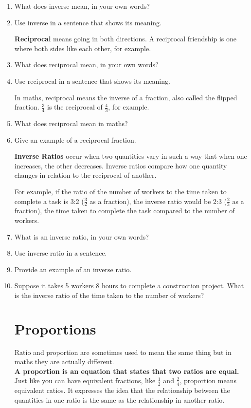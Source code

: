 \documentclass{article}
\begin{document}
\begin{spacing}{1.25}
\begin{enumerate}
\item What does inverse mean, in your own words?
\item Use inverse in a sentence that shows its meaning.

\textbf{Reciprocal} means going in both directions. A reciprocal friendship is one where both sides like each other, for example.

\item What does reciprocal mean, in your own words?
\item Use reciprocal in a sentence that shows its meaning.

In maths, reciprocal means the inverse of a fraction, also called the flipped fraction. $\frac{3}{4}$ is the reciprocal of $\frac{4}{3}$, for example.

\item What does reciprocal mean in maths?
\item Give an example of a reciprocal fraction.

\textbf{Inverse Ratios} occur when two quantities vary in such a way that when one increases, the other decreases. Inverse ratios compare how one quantity changes in relation to the reciprocal of another.

For example, if the ratio of the number of workers to the time taken to complete a task is 3:2 ($\frac{3}{2}$ as a fraction), the inverse ratio would be 2:3 ($\frac{2}{3}$ as a fraction), the time taken to complete the task compared to the number of workers.

\item What is an inverse ratio, in your own words?
\item Use inverse ratio in a sentence.
\item Provide an example of an inverse ratio.
\item Suppose it takes 5 workers 8 hours to complete a construction project. What is the inverse ratio of the time taken to the number of workers?

\section*{Proportions}
Ratio and proportion are sometimes used to mean the same thing but in maths they are actually different.\\

\textbf{A proportion is an equation that states that two ratios are equal.} Just like you can have equivalent fractions, like $\frac{1}{2}$ and $\frac{2}{4}$, proportion means equivalent ratios. It expresses the idea that the relationship between the quantities in one ratio is the same as the relationship in another ratio.


\end{enumerate}
\end{spacing}
\end{document}
